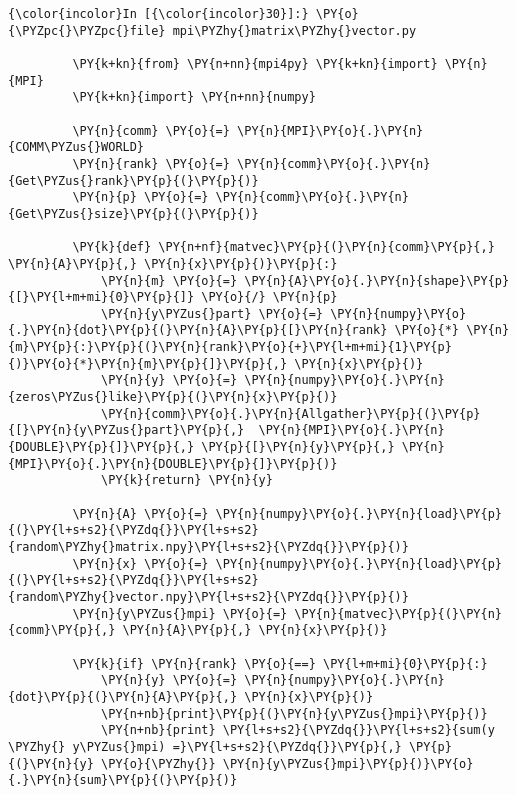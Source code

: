     \begin{Verbatim}[commandchars=\\\{\}]
{\color{incolor}In [{\color{incolor}30}]:} \PY{o}{\PYZpc{}\PYZpc{}file} mpi\PYZhy{}matrix\PYZhy{}vector.py
         
         \PY{k+kn}{from} \PY{n+nn}{mpi4py} \PY{k+kn}{import} \PY{n}{MPI}
         \PY{k+kn}{import} \PY{n+nn}{numpy}
         
         \PY{n}{comm} \PY{o}{=} \PY{n}{MPI}\PY{o}{.}\PY{n}{COMM\PYZus{}WORLD}
         \PY{n}{rank} \PY{o}{=} \PY{n}{comm}\PY{o}{.}\PY{n}{Get\PYZus{}rank}\PY{p}{(}\PY{p}{)}
         \PY{n}{p} \PY{o}{=} \PY{n}{comm}\PY{o}{.}\PY{n}{Get\PYZus{}size}\PY{p}{(}\PY{p}{)}
         
         \PY{k}{def} \PY{n+nf}{matvec}\PY{p}{(}\PY{n}{comm}\PY{p}{,} \PY{n}{A}\PY{p}{,} \PY{n}{x}\PY{p}{)}\PY{p}{:}
             \PY{n}{m} \PY{o}{=} \PY{n}{A}\PY{o}{.}\PY{n}{shape}\PY{p}{[}\PY{l+m+mi}{0}\PY{p}{]} \PY{o}{/} \PY{n}{p}
             \PY{n}{y\PYZus{}part} \PY{o}{=} \PY{n}{numpy}\PY{o}{.}\PY{n}{dot}\PY{p}{(}\PY{n}{A}\PY{p}{[}\PY{n}{rank} \PY{o}{*} \PY{n}{m}\PY{p}{:}\PY{p}{(}\PY{n}{rank}\PY{o}{+}\PY{l+m+mi}{1}\PY{p}{)}\PY{o}{*}\PY{n}{m}\PY{p}{]}\PY{p}{,} \PY{n}{x}\PY{p}{)}
             \PY{n}{y} \PY{o}{=} \PY{n}{numpy}\PY{o}{.}\PY{n}{zeros\PYZus{}like}\PY{p}{(}\PY{n}{x}\PY{p}{)}
             \PY{n}{comm}\PY{o}{.}\PY{n}{Allgather}\PY{p}{(}\PY{p}{[}\PY{n}{y\PYZus{}part}\PY{p}{,}  \PY{n}{MPI}\PY{o}{.}\PY{n}{DOUBLE}\PY{p}{]}\PY{p}{,} \PY{p}{[}\PY{n}{y}\PY{p}{,} \PY{n}{MPI}\PY{o}{.}\PY{n}{DOUBLE}\PY{p}{]}\PY{p}{)}
             \PY{k}{return} \PY{n}{y}
         
         \PY{n}{A} \PY{o}{=} \PY{n}{numpy}\PY{o}{.}\PY{n}{load}\PY{p}{(}\PY{l+s+s2}{\PYZdq{}}\PY{l+s+s2}{random\PYZhy{}matrix.npy}\PY{l+s+s2}{\PYZdq{}}\PY{p}{)}
         \PY{n}{x} \PY{o}{=} \PY{n}{numpy}\PY{o}{.}\PY{n}{load}\PY{p}{(}\PY{l+s+s2}{\PYZdq{}}\PY{l+s+s2}{random\PYZhy{}vector.npy}\PY{l+s+s2}{\PYZdq{}}\PY{p}{)}
         \PY{n}{y\PYZus{}mpi} \PY{o}{=} \PY{n}{matvec}\PY{p}{(}\PY{n}{comm}\PY{p}{,} \PY{n}{A}\PY{p}{,} \PY{n}{x}\PY{p}{)}
         
         \PY{k}{if} \PY{n}{rank} \PY{o}{==} \PY{l+m+mi}{0}\PY{p}{:}
             \PY{n}{y} \PY{o}{=} \PY{n}{numpy}\PY{o}{.}\PY{n}{dot}\PY{p}{(}\PY{n}{A}\PY{p}{,} \PY{n}{x}\PY{p}{)}
             \PY{n+nb}{print}\PY{p}{(}\PY{n}{y\PYZus{}mpi}\PY{p}{)}
             \PY{n+nb}{print} \PY{l+s+s2}{\PYZdq{}}\PY{l+s+s2}{sum(y \PYZhy{} y\PYZus{}mpi) =}\PY{l+s+s2}{\PYZdq{}}\PY{p}{,} \PY{p}{(}\PY{n}{y} \PY{o}{\PYZhy{}} \PY{n}{y\PYZus{}mpi}\PY{p}{)}\PY{o}{.}\PY{n}{sum}\PY{p}{(}\PY{p}{)}
\end{Verbatim}

